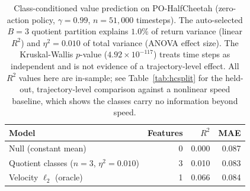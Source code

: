 \begin{table}[h]
\centering
\small
\begin{tabular}{lrrr}
\toprule
Model & Features & $R^2$ & MAE \\
\midrule
  Null (constant mean) & 0 & 0.000 & 0.087 \\
  Quotient classes ($n=3$, $\eta^2=0.010$) & 3 & 0.010 & 0.083 \\
  Velocity $\ell_2$ (oracle) & 1 & 0.066 & 0.084 \\
\bottomrule
\end{tabular}
\caption{Class-conditioned value prediction on PO-HalfCheetah (zero-action policy, $\gamma=0.99$, $n=51,000$ timesteps). The auto-selected $B=3$ quotient partition explains $1.0\%$ of return variance (linear $R^2$) and $\eta^2=0.010$ of total variance (ANOVA effect size). The Kruskal-Wallis $p$-value ($4.92\times10^{-117}$) treats time steps as independent and is not evidence of a trajectory-level effect.  All $R^2$ values here are in-sample; see Table~\ref{tab:hcsplit} for the held-out, trajectory-level comparison against a nonlinear speed baseline, which shows the classes carry no information beyond speed.}
\label{tab:halfcheetah_value_prediction}
\end{table}